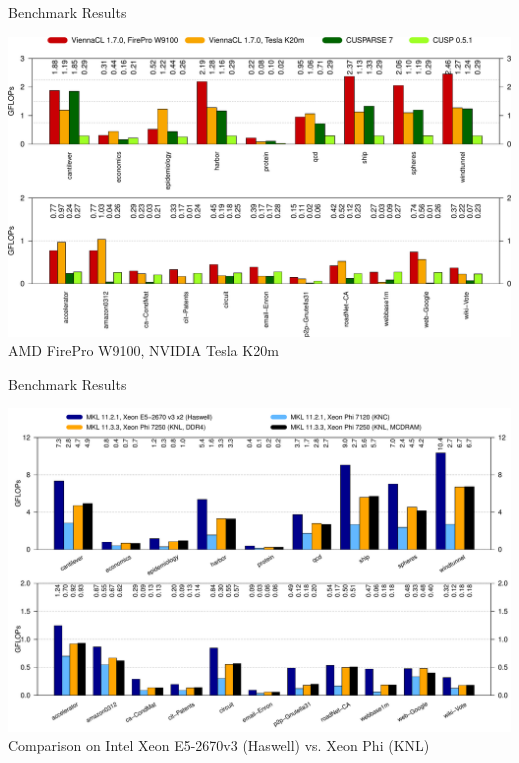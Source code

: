 \begin{frame}{Benchmark Results}
 \begin{center}
  \includegraphics[width=0.999\textwidth]{figures/spgemm_gpu} \\
 AMD FirePro W9100, NVIDIA Tesla K20m
 \end{center}
\end{frame}


\begin{frame}{Benchmark Results}
 \begin{center}
  \includegraphics[width=0.999\textwidth]{figures/spgemm-intel} \\
 Comparison on Intel Xeon E5-2670v3 (Haswell) vs. Xeon Phi (KNL)
 \end{center}
\end{frame}

